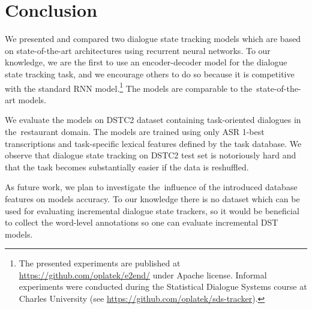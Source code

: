 \documentclass{itatnew}
\def\PB#1{\textcolor{red}{PB: \textit{#1}}}
\begin{document}
\section{Conclusion}\label{sec:conc}
We presented and compared two dialogue state tracking models which are based on state-of-the-art architectures using recurrent neural networks.
To our knowledge, we are the first to use an encoder-decoder model for the dialogue state tracking task, and we encourage others to do so because it is competitive with the standard RNN model.\footnote{The presented experiments are published at \url{https://github.com/oplatek/e2end/} under Apache license. Informal experiments were conducted during the Statistical Dialogue Systems course at Charles University (see \url{https://github.com/oplatek/sds-tracker}).}
The models are comparable to the~state-of-the-art models.  %

We evaluate the models on DSTC2 dataset containing  task-oriented dialogues in the~restaurant domain. 
The models are trained using only ASR 1-best transcriptions and task-specific lexical features defined by the task database.
We observe that  dialogue state tracking on DSTC2 test set is notoriously hard and that the task becomes substantially easier if the data is reshuffled.

As future work, we plan to investigate the~influence of the introduced database features on models accuracy.
To our knowledge there is no dataset which can be used for evaluating incremental dialogue state trackers, so it would be beneficial to collect the word-level annotations so one can evaluate incremental DST models.

% 


\end{document}
